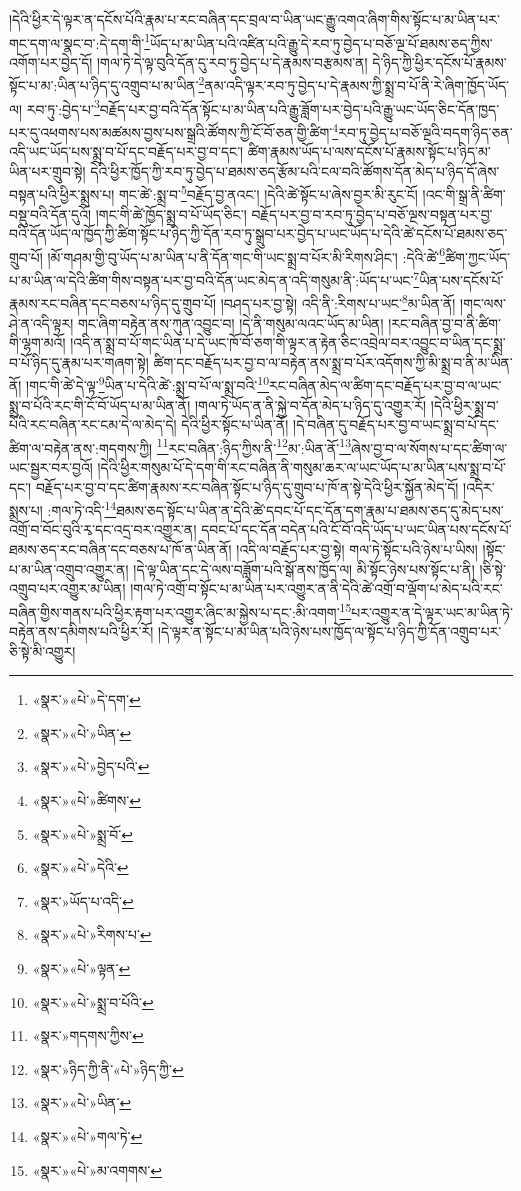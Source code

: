 །དེའི་ཕྱིར་དེ་ལྟར་ན་དངོས་པོའི་རྣམ་པ་རང་བཞིན་དང་བྲལ་བ་ཡིན་ཡང་རྒྱུ་འགའ་ཞིག་གིས་སྟོང་པ་མ་ཡིན་པར་གང་དག་ལ་སྣང་བ་:དེ་དག་གི་\footnote{«སྣར་»«པེ་»དེ་དག་}ཡོད་པ་མ་ཡིན་པའི་འཛིན་པའི་རྒྱུ་དེ་རབ་ཏུ་བྱེད་པ་བཅོ་ལྔ་པོ་ཐམས་ཅད་ཀྱིས་འགོག་པར་བྱེད་དོ། །གལ་ཏེ་དེ་ལྟ་བུའི་དོན་དུ་རབ་ཏུ་བྱེད་པ་དེ་རྣམས་བརྩམས་ན། དེ་ཉིད་ཀྱི་ཕྱིར་དངོས་པོ་རྣམས་སྟོང་པ་མ་:ཡིན་པ་ཉིད་དུ་འགྲུབ་པ་མ་ཡིན་\footnote{«སྣར་»«པེ་»ཡིན་}ནམ་འདི་ལྟར་རབ་ཏུ་བྱེད་པ་དེ་རྣམས་ཀྱི་སྨྲ་བ་པོ་ནི་རེ་ཞིག་ཁྱོད་ཡོད་ལ། རབ་ཏུ་:བྱེད་པ་\footnote{«སྣར་»«པེ་»བྱེད་པའི་}བརྗོད་པར་བྱ་བའི་དོན་སྟོང་པ་མ་ཡིན་པའི་རྒྱུ་ཟློག་པར་བྱེད་པའི་རྒྱུ་ཡང་ཡོད་ཅིང་དོན་ཁྱད་པར་དུ་འཕགས་པས་མཚམས་བྱས་པས་སྒྲའི་ཚོགས་ཀྱི་ངོ་བོ་ཅན་གྱི་ཚིག་\footnote{«སྣར་»«པེ་»ཚིགས་}རབ་ཏུ་བྱེད་པ་བཅོ་ལྔའི་བདག་ཉིད་ཅན་འདི་ཡང་ཡོད་པས་སྨྲ་བ་པོ་དང་བརྗོད་པར་བྱ་བ་དང་། ཚིག་རྣམས་ཡོད་པ་ལས་དངོས་པོ་རྣམས་སྟོང་པ་ཉིད་མ་ཡིན་པར་གྲུབ་སྟེ། དེའི་ཕྱིར་ཁྱོད་ཀྱི་རབ་ཏུ་བྱེད་པ་ཐམས་ཅད་རྩོམ་པའི་ངལ་བའི་ཚོགས་དོན་མེད་པ་ཉིད་དོ་ཞེས་བསྟན་པའི་ཕྱིར་སྨྲས་པ། གང་ཚེ་:སྨྲ་བ་\footnote{«སྣར་»«པེ་»སྨྲ་བོ་}བརྗོད་བྱ་ནའང་། །དེའི་ཚེ་སྟོང་པ་ཞེས་བྱར་མི་རུང་ངོ། །འང་གི་སྒྲ་ནི་ཚིག་བསྡུ་བའི་དོན་དུའོ། །གང་གི་ཚེ་ཁྱོད་སྨྲ་བ་པོ་ཡོད་ཅིང་། བརྗོད་པར་བྱ་བ་རབ་ཏུ་བྱེད་པ་བཅོ་ལྔས་བསྟན་པར་བྱ་བའི་དོན་ཡོད་ལ་ཁྱོད་ཀྱི་ཚིག་སྟོང་པ་ཉིད་ཀྱི་དོན་རབ་ཏུ་སྒྲུབ་པར་བྱེད་པ་ཡང་ཡོད་པ་དེའི་ཚེ་དངོས་པོ་ཐམས་ཅད་གྲུབ་པོ། །མོ་གཤམ་གྱི་བུ་ཡོད་པ་མ་ཡིན་པ་ནི་དོན་གང་གི་ཡང་སྨྲ་བ་པོར་མི་རིགས་ཤིང་། :དེའི་ཚེ་\footnote{«སྣར་»«པེ་»དེའི་}ཚིག་ཀྱང་ཡོད་པ་མ་ཡིན་ལ་དེའི་ཚིག་གིས་བསྟན་པར་བྱ་བའི་དོན་ཡང་མེད་ན་འདི་གསུམ་ནི་:ཡོད་པ་ཡང་\footnote{«སྣར་»ཡོད་པ་འདི་}ཡིན་པས་དངོས་པོ་རྣམས་རང་བཞིན་དང་བཅས་པ་ཉིད་དུ་གྲུབ་པོ། །བཤད་པར་བྱ་སྟེ། འདི་ནི་:རིགས་པ་ཡང་\footnote{«སྣར་»«པེ་»རིགས་པ་}མ་ཡིན་ནོ། །གང་ལས་ཤེ་ན་འདི་ལྟར། གང་ཞིག་བརྟེན་ནས་ཀུན་འབྱུང་བ། །དེ་ནི་གསུམ་ལའང་ཡོད་མ་ཡིན། །རང་བཞིན་བྱ་བ་ནི་ཚིག་གི་ལྷག་མའོ། །འདི་ན་སྨྲ་བ་པོ་གང་ཡིན་པ་དེ་ཡང་ཁོ་བོ་ཅག་གི་ལྟར་ན་རྟེན་ཅིང་འབྲེལ་བར་འབྱུང་བ་ཡིན་དང་སྨྲ་བ་པོ་ཉིད་དུ་རྣམ་པར་གཞག་སྟེ། ཚིག་དང་བརྗོད་པར་བྱ་བ་ལ་བརྟེན་ནས་སྨྲ་བ་པོར་འདོགས་ཀྱི་མི་སྨྲ་བ་ནི་མ་ཡིན་ནོ། །གང་གི་ཚེ་དེ་ལྟ་\footnote{«སྣར་»«པེ་»ལྟན་}ཡིན་པ་དེའི་ཚེ་:སྨྲ་བ་པོ་ལ་སྨྲ་བའི་\footnote{«སྣར་»«པེ་»སྨྲ་བ་པོའི་}རང་བཞིན་མེད་ལ་ཚིག་དང་བརྗོད་པར་བྱ་བ་ལ་ཡང་སྨྲ་བ་པོའི་རང་གི་ངོ་བོ་ཡོད་པ་མ་ཡིན་ནོ། །གལ་ཏེ་ཡོད་ན་ནི་སྐྱེ་བ་དོན་མེད་པ་ཉིད་དུ་འགྱུར་རོ། །དེའི་ཕྱིར་སྨྲ་བ་པོའི་རང་བཞིན་རང་ངམ་དེ་ལ་མེད་དེ། དེའི་ཕྱིར་སྟོང་པ་ཡིན་ནོ། །དེ་བཞིན་དུ་བརྗོད་པར་བྱ་བ་ཡང་སྨྲ་བ་པོ་དང་ཚིག་ལ་བརྟེན་ནས་:གདགས་ཀྱི། \footnote{«སྣར་»གདགས་ཀྱིས་}རང་བཞིན་:ཉིད་ཀྱིས་ནི་\footnote{«སྣར་»ཉིད་ཀྱི་ནི་«པེ་»ཉིད་ཀྱི་}མ་:ཡིན་ནོ་\footnote{«སྣར་»«པེ་»ཡིན་}ཞེས་བྱ་བ་ལ་སོགས་པ་དང་ཚིག་ལ་ཡང་སྦྱར་བར་བྱའོ། །དེའི་ཕྱིར་གསུམ་པོ་དེ་དག་གི་རང་བཞིན་ནི་གསུམ་ཆར་ལ་ཡང་ཡོད་པ་མ་ཡིན་པས་སྨྲ་བ་པོ་དང་། བརྗོད་པར་བྱ་བ་དང་ཚིག་རྣམས་རང་བཞིན་སྟོང་པ་ཉིད་དུ་གྲུབ་པ་ཁོ་ན་སྟེ་དེའི་ཕྱིར་སྐྱོན་མེད་དོ། །འདིར་སྨྲས་པ། :གལ་ཏེ་འདི་\footnote{«སྣར་»«པེ་»གལ་ཏེ་}ཐམས་ཅད་སྟོང་པ་ཡིན་ན་དེའི་ཚེ་དབང་པོ་དང་དོན་དག་རྣམ་པ་ཐམས་ཅད་དུ་མེད་པས་འགྲོ་བ་བོང་བུའི་རྭ་དང་འདྲ་བར་འགྱུར་ན། དབང་པོ་དང་དོན་བདེན་པའི་ངོ་བོ་འདི་ཡོད་པ་ཡང་ཡིན་པས་དངོས་པོ་ཐམས་ཅད་རང་བཞིན་དང་བཅས་པ་ཁོ་ན་ཡིན་ནོ། །འདི་ལ་བརྗོད་པར་བྱ་སྟེ། གལ་ཏེ་སྟོང་པའི་ཉེས་པ་ཡིས། །སྟོང་པ་མ་ཡིན་འགྲུབ་འགྱུར་ན། །དེ་ལྟ་ཡིན་དང་དེ་ལས་བཟློག་པའི་སྒོ་ནས་ཁྱོད་ལ། མི་སྟོང་ཉེས་པས་སྟོང་པ་ནི། །ཅི་སྟེ་འགྲུབ་པར་འགྱུར་མ་ཡིན། །གལ་ཏེ་འགྲོ་བ་སྟོང་པ་མ་ཡིན་པར་འགྱུར་ན་ནི་དེའི་ཚེ་འགྲོ་བ་ལྡོག་པ་མེད་པའི་རང་བཞིན་གྱིས་གནས་པའི་ཕྱིར་རྟག་པར་འགྱུར་ཞིང་མ་སྐྱེས་པ་དང་:མི་འགག་\footnote{«སྣར་»«པེ་»མ་འགགས་}པར་འགྱུར་ན་དེ་ལྟར་ཡང་མ་ཡིན་ཏེ་བརྟེན་ནས་དམིགས་པའི་ཕྱིར་རོ། །དེ་ལྟར་ན་སྟོང་པ་མ་ཡིན་པའི་ཉེས་པས་ཁྱོད་ལ་སྟོང་པ་ཉིད་ཀྱི་དོན་འགྲུབ་པར་ཅི་སྟེ་མི་འགྱུར། 